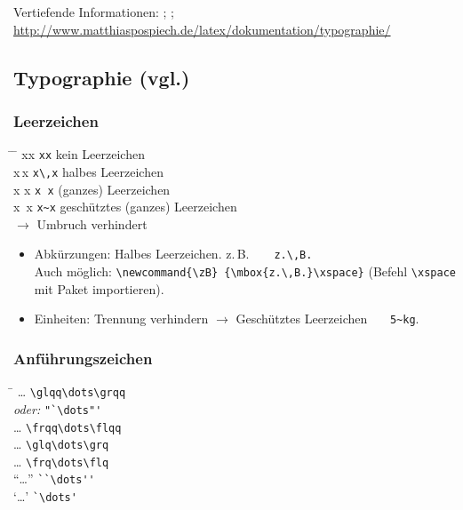 \columnbreak
{}
Vertiefende Informationen: 
\cite{typokurz}; 
\cite{Struckmann};
\url{http://www.matthiaspospiech.de/latex/dokumentation/typographie/}
\vspace{-0.5\baselineskip}

\subsection{Typographie \texorpdfstring{(vgl.\cite{Struckmann})}{}} \label{sec:typo}

\subsubsection*{Leerzeichen}

\begin{tabbing}
\hspace{1.7em}	\= \hspace{2.2em}  	\=  \kill  %
%
	xx					\> \lstinline|xx|			\> kein Leerzeichen   \\
	x\,x				\> \lstinline|x\,x|		\>	halbes Leerzeichen	\\
	x x					\> \lstinline|x x|   	\>	(ganzes) Leerzeichen	\\
	x~x					\> \lstinline|x~x|		\> 	geschütztes (ganzes) Leerzeichen 
	\\ \>\> $\rightarrow$ Umbruch verhindert 
\end{tabbing}


\addtolength{\leftmargini}{-10pt}

\begin{itemize}
	\item Abkürzungen: Halbes Leerzeichen. {z.\,B.~~~~\lstinline|z.\,B.|} \\
		Auch möglich: \lstinline|\newcommand{\zB} {\mbox{z.\,B.}\xspace}| (Befehl \verb|\xspace| mit Paket  importieren).
	\item Einheiten: Trennung verhindern $\rightarrow$ Geschütztes Leerzeichen ~~~\lstinline|5~kg|.
\end{itemize}
\negAbstand

\addtolength{\leftmargini}{+10pt}

\subsubsection*{Anführungszeichen}
	
\begin{tabbing}
	\hspace{5em} 			\= \kill
%
	\glqq\dots\grqq		\> \lstinline|\glqq\dots\grqq| 	\\
										\> \emph{oder:} \lstinline|"`\dots"'| \\
	\frqq\dots\flqq		\> \lstinline|\frqq\dots\flqq|	\\
	\glq\dots\grq			\> \lstinline|\glq\dots\grq|   	\\
	\frq\dots\flq 		\> \lstinline|\frq\dots\flq| 		\\
	``\dots''					\> \lstinline|``\dots''|  			\\
	`\dots' 					\> \lstinline|`\dots'| 
\end{tabbing}



